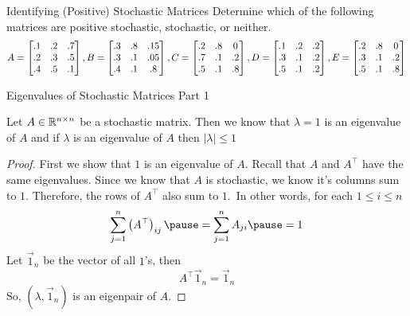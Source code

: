 \documentclass[xcoler=dvipsnames, aspectratio=169]{beamer}
\newcommand{\abs}[1]{\left|#1\right|}
\begin{document}
    \begin{frame}{Identifying (Positive) Stochastic Matrices}
        Determine which of the following matrices are positive stochastic, stochastic, or neither.\pause
        \[
            A = \begin{bmatrix}
                .1 & .2 & .7\\
                .2 & .3 & .5\\
                .4 & .5 & .1
            \end{bmatrix}, B = \begin{bmatrix}
                .3 & .8 &.15\\
                .3 & .1 &.05\\
                .4 & .1 &.8
            \end{bmatrix}, C = \begin{bmatrix}
                .2 & .8 & 0\\
                .7 & .1 &.2\\
                .5 & .1 &.8
            \end{bmatrix}, D = \begin{bmatrix}
                .1 & .2 &.2\\
                .3 & .1 &.2\\
                .5 & .1 &.2
            \end{bmatrix}, E = \begin{bmatrix}
                .2 & .8 & 0\\
                .3 & .1 &.2\\
                .5 & .1 &.8
            \end{bmatrix}
        \]
    \end{frame}
    \begin{frame}{Eigenvalues of Stochastic Matrices Part 1}
        \small
        \begin{theorem}
            Let $A\in\mathbb{R}^{n\times n}$ be a stochastic matrix. Then we know that $\lambda=1$ is an
            eigenvalue of $A$ and if $\lambda$ is an eigenvalue of $A$ then $\abs{\lambda}\leq 1$
        \end{theorem}\pause
        \begin{proof}
            First we show that $1$ is an eigenvalue of $A$. Recall that $A$ and $A^\top$ have the 
            same eigenvalues. Since we know that $A$ is stochastic, we know it's columns sum to $1$.
            Therefore, the rows of $A^\top$ also sum to $1$.\pause\ In other words, for each 
            $1\leq i\leq n$
            \[
                \sum_{j=1}^n\left(A^\top\right)_{ij}\pause = 
                \sum_{j=1}^n A_{ji}\pause = 1
            \]
            Let $\vec{1}_n$ be the vector of all $1$'s, then\pause
            \[
                A^\top\vec{1}_n = \vec{1}_n
            \]
            So, $(\lambda,\vec{1}_n)$ is an eigenpair of $A$.
        \end{proof}
    \end{frame}
\end{document}
